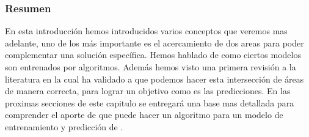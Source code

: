 \subsubsection{Resumen}

En esta introducción hemos introducidos varios conceptos que veremos mas adelante, uno de los más importante es el acercamiento de dos areas para poder complementar una solución específica. Hemos hablado de como ciertos modelos son entrenados por algoritmos. Además hemos visto una primera revisión a la literatura en la cual ha validado a que podemos hacer esta intersección de áreas de manera correcta, para lograr un objetivo como es las predicciones. En las proximas secciones de este capitulo se entregará una base mas detallada para comprender el aporte de que puede hacer un algoritmo \losslessdatacompression para un modelo de entrenamiento y predicción de \machinelearning.








